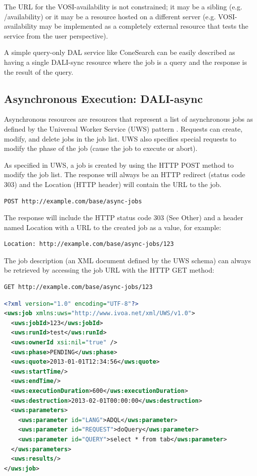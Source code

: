 \documentclass[11pt,letter]{ivoa}
\begin{document}
The URL for the VOSI-availability is not constrained; it may be a sibling (e.g. /availability) 
or it may be a resource hosted on a different server (e.g. VOSI-availability 
may be implemented as a 
completely external resource that tests the service from the user perspective).

A simple query-only DAL service like ConeSearch can be easily described as 
having a single DALI-sync resource where the job is a query and the response is 
the result of the query. 

\subsection{Asynchronous Execution: DALI-async}
\label{sec:dali-async}
Asynchronous resources are resources that represent a list of asynchronous jobs 
as defined by the Universal Worker Service (UWS) pattern \citep{std:UWS}. 
Requests can 
create, modify, and delete jobs in the job list. UWS also specifies special 
requests to modify the phase of the job (cause the job to execute or abort).

As specified in UWS, a job is created by using the HTTP POST method to modify 
the job list. The response will always be an HTTP redirect (status code 303) and 
the Location (HTTP header) will contain the URL to the job.

\begin{verbatim}
POST http://example.com/base/async-jobs
\end{verbatim}

The response will include the HTTP status code 303 (See Other) and a header 
named Location with a URL to the created job as a value, for example:

\begin{verbatim}
Location: http://example.com/base/async-jobs/123
\end{verbatim}

The job description (an XML document defined by the UWS schema) can always be 
retrieved by accessing the job URL with the HTTP GET method:

\begin{verbatim}
GET http://example.com/base/async-jobs/123
\end{verbatim}

\begin{lstlisting}[language=XML,basicstyle=\footnotesize]
<?xml version="1.0" encoding="UTF-8"?>
<uws:job xmlns:uws="http://www.ivoa.net/xml/UWS/v1.0">
  <uws:jobId>123</uws:jobId>
  <uws:runId>test</uws:runId>
  <uws:ownerId xsi:nil="true" />
  <uws:phase>PENDING</uws:phase>
  <uws:quote>2013-01-01T12:34:56</uws:quote>
  <uws:startTime/>
  <uws:endTime/>
  <uws:executionDuration>600</uws:executionDuration>
  <uws:destruction>2013-02-01T00:00:00</uws:destruction>
  <uws:parameters>
    <uws:parameter id="LANG">ADQL</uws:parameter>
    <uws:parameter id="REQUEST">doQuery</uws:parameter>
    <uws:parameter id="QUERY">select * from tab</uws:parameter>
  </uws:parameters>
  <uws:results/>
</uws:job>
\end{lstlisting}
\end{document}
